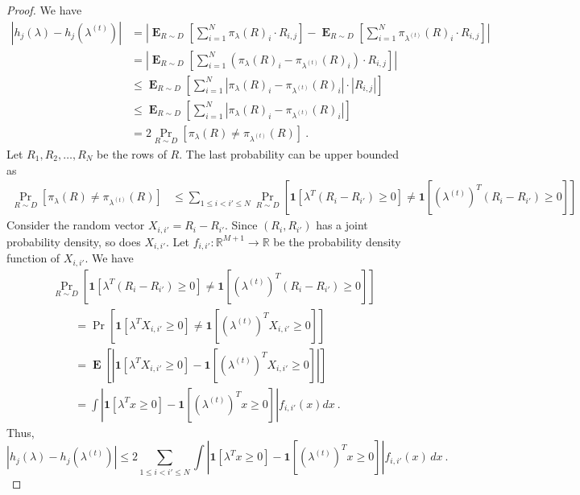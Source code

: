 \documentclass[12pt]{article}
\newcommand{\R}{\mathbb{R}}
\DeclareMathOperator*{\Exp}{\mathbf{E}}
\theoremstyle{definition}
\begin{document}
\begin{proof}
We have
\begin{align*}
|h_j(\lambda) - h_j(\lambda^{(t)})|
& = \left|\Exp_{R \sim D} \left[ \sum_{i=1}^N \pi_{\lambda}(R)_i \cdot R_{i,j} \right] -  \Exp_{R \sim D} \left[ \sum_{i=1}^N \pi_{\lambda^{(t)}}(R)_i \cdot R_{i,j} \right] \right| \\
& = \left| \Exp_{R \sim D} \left[ \sum_{i=1}^N (\pi_{\lambda}(R)_i - \pi_{\lambda^{(t)}}(R)_i) \cdot R_{i,j} \right] \right| \\
& \le \Exp_{R \sim D} \left[ \sum_{i=1}^N |\pi_{\lambda}(R)_i - \pi_{\lambda^{(t)}}(R)_i| \cdot |R_{i,j}| \right] \\
& \le \Exp_{R \sim D} \left[ \sum_{i=1}^N |\pi_{\lambda}(R)_i - \pi_{\lambda^{(t)}}(R)_i| \right] \\
& = 2 \Pr_{R \sim D} \left[ \pi_{\lambda}(R) \neq \pi_{\lambda^{(t)}}(R) \right] \: .
\end{align*}
Let $R_1, R_2, \dots, R_N$ be the rows of $R$. The last probability can be upper bounded as
\begin{align*}
\Pr_{R \sim D} \left[ \pi_{\lambda}(R) \neq \pi_{\lambda^{(t)}}(R) \right]
& \le \sum_{1 \le i < i' \le N} \Pr_{R \sim D} \left[ \mathbf{1} \left[ \lambda^T (R_i - R_{i'}) \ge 0 \right] \neq \mathbf{1} \left[ (\lambda^{(t)})^T (R_i - R_{i'}) \ge 0 \right]  \right]
\end{align*}
Consider the random vector $X_{i,i'} = R_i - R_{i'}$. Since $(R_i, R_{i'})$
has a joint probability density, so does $X_{i,i'}$. Let $f_{i,i'}:\R^{M+1}
\to \R$ be the probability density function of $X_{i,i'}$. We have
\begin{align*}
& \Pr_{R \sim D} \left[ \mathbf{1} \left[ \lambda^T (R_i - R_{i'}) \ge 0 \right] \neq \mathbf{1} \left[ (\lambda^{(t)})^T (R_i - R_{i'}) \ge 0 \right]  \right] \\
& \qquad = \Pr \left[ \mathbf{1} \left[ \lambda^T X_{i,i'} \ge 0 \right] \neq \mathbf{1} \left[ (\lambda^{(t)})^T X_{i,i'} \ge 0 \right]  \right] \\
& \qquad = \Exp \left[ \left| \mathbf{1} \left[ \lambda^T X_{i,i'} \ge 0 \right]  -  \mathbf{1} \left[ (\lambda^{(t)})^T X_{i,i'} \ge 0 \right] \right| \right] \\
& \qquad = \int \left| \mathbf{1} \left[ \lambda^T x \ge 0 \right]  -  \mathbf{1} \left[ (\lambda^{(t)})^T x \ge 0 \right] \right| f_{i,i'}(x) dx \: .
\end{align*}
Thus,
\begin{equation}
\label{equation:continuity}
|h_j(\lambda) - h_j(\lambda^{(t)})| \le 2 \sum_{1 \le i < i' \le N} \int \left| \mathbf{1} \left[ \lambda^T x \ge 0 \right]  -  \mathbf{1} \left[ (\lambda^{(t)})^T x \ge 0 \right] \right| f_{i,i'}(x) \, dx \: .

\end{equation}
\end{proof}
\end{document}
